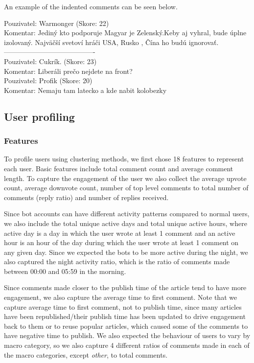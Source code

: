 \documentclass[11pt,a4paper]{article}
\begin{document}
An example of the indented comments can be seen below.
\begin{tcolorbox}[colback=gray!5!white, colframe=gray!75!black, title=Example of Hierarchical Comment Input (\{summary\} variable), fonttitle=\bfseries, fontupper=\small\ttfamily\raggedright]
	Pouzivatel: Warmonger (Skore: 22) \\
	Komentar: Jediný kto podporuje Magyar je Zelenský.Keby aj vyhral, bude úplne izolovaný. Najväčší svetoví hráči USA, Rusko , Čína ho budú ignorovať. \\[0.5em]
	---------------------------------------- \\[0.5em]
	Pouzivatel: Cukrík. (Skore: 23) \\
	Komentar: Liberáli prečo nejdete na front? \\
	\hspace*{2em} Pouzivatel: Profik (Skore: 20) \\
	\hspace*{2em} Komentar: Nemaju tam latecko a kde nabit kolobezky
\end{tcolorbox}

\subsection{User profiling}

\subsubsection{Features}
To profile users using clustering methods, we first chose 18 features to represent each user. Basic features include total comment count and average comment length. To capture the engagement of the user we also collect the average upvote count, average downvote count, number of top level comments to total number of comments (reply ratio) and number of replies received.

Since bot accounts can have different activity patterns compared to normal users, we also include the total unique active days and total unique active hours, where active day is a day in which the user wrote at least 1 comment and an active hour is an hour of the day during which the user wrote at least 1 comment on any given day. Since we expected the bots to be more active during the night, we also captured the night activity ratio, which is the ratio of comments made between 00:00 and 05:59 in the morning.

Since comments made closer to the publish time of the article tend to have more engagement, we also capture the average time to first comment. Note that we capture average time to first comment, not to publish time, since many articles have been republished/their publish time has been updated to drive engagement back to them or to reuse popular articles, which caused some of the comments to have negative time to publish. We also expected the behaviour of users to vary by macro category, so we also capture 4 different ratios of comments made in each of the macro categories, except \textit{other}, to total comments.
\end{document}
